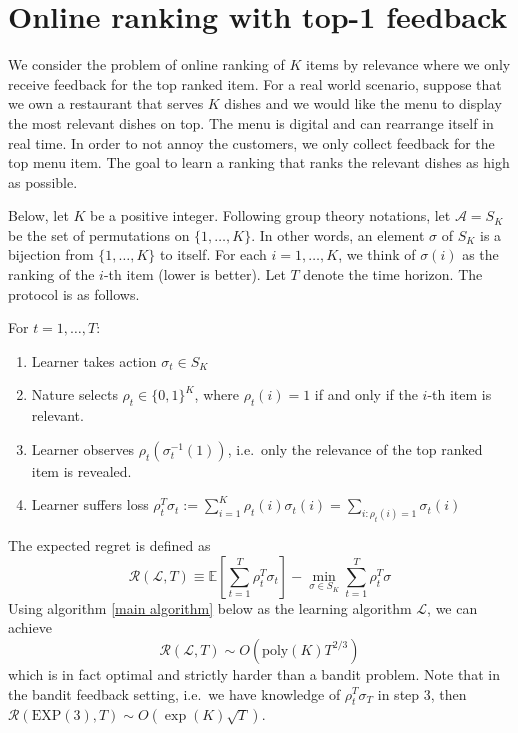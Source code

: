 \documentclass[11pt]{article}
\begin{document}
\section{Online ranking with top-1 feedback}
We consider the problem of online ranking of $K$ items by relevance where we only receive feedback for the top ranked item. For a real world scenario, suppose that we own a restaurant that serves $K$ dishes and we would like the menu to display the most relevant dishes on top. The menu is digital and can rearrange itself in real time. In order to not annoy the customers, we only collect feedback for the top menu item. The goal to learn a ranking that ranks the relevant dishes as high as possible.

Below, let $K$ be a positive integer. Following group theory notations, let $\mathcal{A} = S_K$ be the set of permutations on $\{1,\dots, K\}$. In other words, an element $\sigma$ of $S_K$ is a bijection from $\{1,\dots, K\}$ to itself. For each $i = 1,\dots, K$, we think of $\sigma(i)$ as the ranking of the $i$-th item (lower is better). Let $T$ denote the time horizon. The protocol is as follows. 

For $t = 1,\dots, T$:
\begin{enumerate}
    \item Learner takes action $\sigma_t \in S_K$
    \item Nature selects $\rho_t \in \{0,1\}^K$, where $\rho_t(i) =1$ if and only if the $i$-th item is relevant.
    \item Learner observes $\rho_t(\sigma_t^{-1}(1))$, i.e.\ only the relevance of the top ranked item is revealed.
    \item Learner suffers loss $\rho_t^T \sigma_t := \sum_{i=1}^K \rho_t(i) \sigma_t(i) = \sum_{i: \rho_t(i) = 1} \sigma_t(i)$
\end{enumerate}


The expected regret is defined as 
\begin{equation}\label{expected regret}\mathcal{R}(\mathcal{L},T) \equiv \mathbb{E}\left[ \sum_{t=1}^T \rho_t^T \sigma_t\right]  - \min_{\sigma \in S_K} \sum_{t=1}^T \rho_t^T \sigma\end{equation}
Using algorithm \ref{main algorithm} below as the learning algorithm $\mathcal{L}$, we can achieve \begin{equation}\label{expected regret bound}\mathcal{R}(\mathcal{L},T) \sim O(\mathrm{poly}(K)T^{2/3})
\end{equation}which is in fact optimal and strictly harder than a bandit problem. Note that in the bandit feedback setting, i.e.\ we have knowledge of $\rho_t^T \sigma_T$ in step 3, then $\mathcal{R}(\mathrm{EXP}(3), T) \sim O(\exp(K)\sqrt{T})$.
\end{document}
